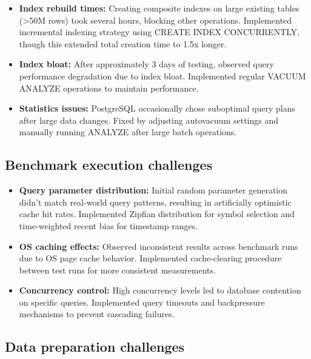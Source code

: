 \documentclass[11pt,a4paper]{article}
\begin{document}
\begin{itemize}
    \item \textbf{Index rebuild times:} Creating composite indexes on large existing tables (>50M rows) took several hours, blocking other operations. Implemented incremental indexing strategy using CREATE INDEX CONCURRENTLY, though this extended total creation time to 1.5x longer.
    
    \item \textbf{Index bloat:} After approximately 3 days of testing, observed query performance degradation due to index bloat. Implemented regular VACUUM ANALYZE operations to maintain performance.
    
    \item \textbf{Statistics issues:} PostgreSQL occasionally chose suboptimal query plans after large data changes. Fixed by adjusting autovacuum settings and manually running ANALYZE after large batch operations.
\end{itemize}

\subsection{Benchmark execution challenges}

\begin{itemize}
    \item \textbf{Query parameter distribution:} Initial random parameter generation didn't match real-world query patterns, resulting in artificially optimistic cache hit rates. Implemented Zipfian distribution for symbol selection and time-weighted recent bias for timestamp ranges.
    
    \item \textbf{OS caching effects:} Observed inconsistent results across benchmark runs due to OS page cache behavior. Implemented cache-clearing procedure between test runs for more consistent measurements.
    
    \item \textbf{Concurrency control:} High concurrency levels led to database contention on specific queries. Implemented query timeouts and backpressure mechanisms to prevent cascading failures.
\end{itemize}

\subsection{Data preparation challenges}
\end{document}
